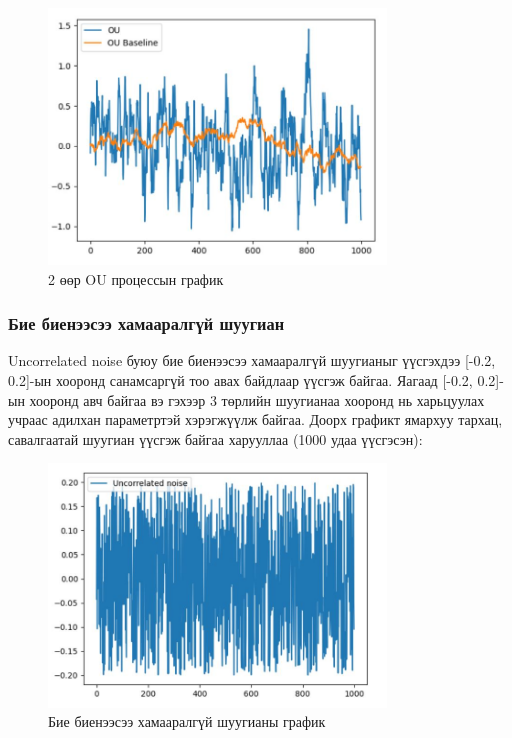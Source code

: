 \documentclass[12pt,A4]{report}
\begin{document}
\begin{figure}[H]
\centering
\includegraphics[width=0.8\textwidth]{./images/OU_OUBaseline_Graph}
\caption{2 өөр OU процессын график}
\end{figure}

\subsubsection{Бие биенээсээ хамааралгүй шуугиан}

Uncorrelated noise буюу бие биенээсээ хамааралгүй шуугианыг үүсгэхдээ [-0.2, 0.2]-ын хооронд санамсаргүй тоо авах байдлаар үүсгэж байгаа. Яагаад [-0.2, 0.2]-ын хооронд авч байгаа вэ гэхээр 3 төрлийн шуугианаа хооронд нь харьцуулах учраас адилхан параметртэй хэрэгжүүлж байгаа. Доорх графикт ямархуу тархац, савалгаатай шуугиан үүсгэж байгаа харууллаа (1000 удаа үүсгэсэн):

\begin{figure}[H]
\centering
\includegraphics[width=0.8\textwidth]{./images/Uncorrelated_noise}
\caption{Бие биенээсээ хамааралгүй шуугианы график}
\end{figure}
\end{document}
